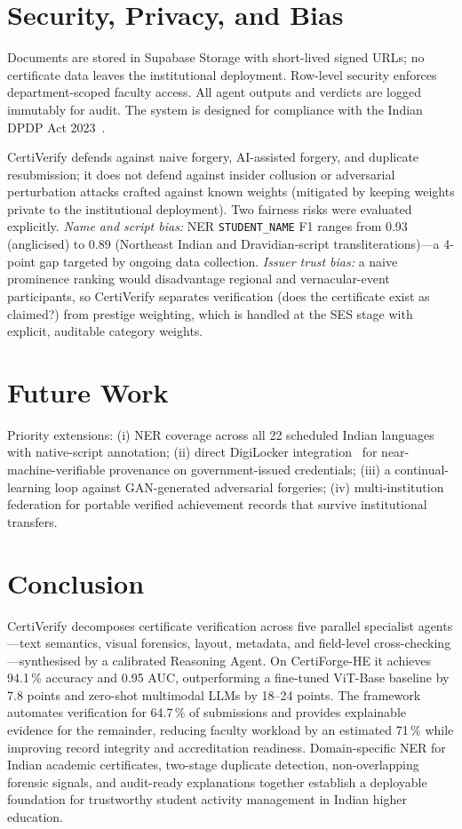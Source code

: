 \documentclass[runningheads]{llncs}
\begin{document}
\section{Security, Privacy, and Bias}
\label{sec:security}

Documents are stored in Supabase Storage with short-lived signed URLs; no certificate data leaves the institutional deployment. Row-level security enforces department-scoped faculty access. All agent outputs and verdicts are logged immutably for audit. The system is designed for compliance with the Indian DPDP Act 2023~\cite{dpdp2023}.

CertiVerify defends against naive forgery, AI-assisted forgery, and duplicate resubmission; it does not defend against insider collusion or adversarial perturbation attacks crafted against known weights (mitigated by keeping weights private to the institutional deployment). Two fairness risks were evaluated explicitly. \textit{Name and script bias:} NER \texttt{STUDENT\_NAME} F1 ranges from 0.93 (anglicised) to 0.89 (Northeast Indian and Dravidian-script transliterations)---a 4-point gap targeted by ongoing data collection. \textit{Issuer trust bias:} a naive prominence ranking would disadvantage regional and vernacular-event participants, so CertiVerify separates verification (does the certificate exist as claimed?) from prestige weighting, which is handled at the SES stage with explicit, auditable category weights.

\section{Future Work}
\label{sec:future}

Priority extensions: (i) NER coverage across all 22 scheduled Indian languages with native-script annotation; (ii) direct DigiLocker integration~\cite{digilocker2024} for near-machine-verifiable provenance on government-issued credentials; (iii) a continual-learning loop against GAN-generated adversarial forgeries; (iv) multi-institution federation for portable verified achievement records that survive institutional transfers.

\section{Conclusion}
\label{sec:conclusion}

CertiVerify decomposes certificate verification across five parallel specialist agents---text semantics, visual forensics, layout, metadata, and field-level cross-checking---synthesised by a calibrated Reasoning Agent. On CertiForge-HE it achieves 94.1\,\% accuracy and 0.95 AUC, outperforming a fine-tuned ViT-Base baseline by 7.8 points and zero-shot multimodal LLMs by 18--24 points. The framework automates verification for 64.7\,\% of submissions and provides explainable evidence for the remainder, reducing faculty workload by an estimated 71\,\% while improving record integrity and accreditation readiness. Domain-specific NER for Indian academic certificates, two-stage duplicate detection, non-overlapping forensic signals, and audit-ready explanations together establish a deployable foundation for trustworthy student activity management in Indian higher education.
\end{document}
